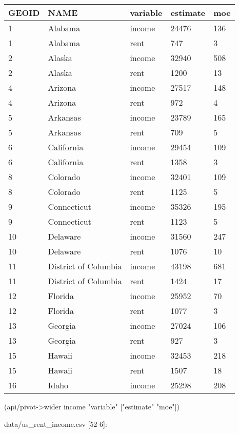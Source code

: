 \documentclass[]{article}
\newenvironment{Shaded}{\begin{snugshade}}{\end{snugshade}}
\newcommand{\StringTok}[1]{\textcolor[rgb]{0.31,0.60,0.02}{#1}}
\newcommand{\NormalTok}[1]{#1}
\begin{document}
\begin{longtable}[]{@{}lllll@{}}
\toprule
GEOID & NAME & variable & estimate & moe\tabularnewline
\midrule
\endhead
1 & Alabama & income & 24476 & 136\tabularnewline
1 & Alabama & rent & 747 & 3\tabularnewline
2 & Alaska & income & 32940 & 508\tabularnewline
2 & Alaska & rent & 1200 & 13\tabularnewline
4 & Arizona & income & 27517 & 148\tabularnewline
4 & Arizona & rent & 972 & 4\tabularnewline
5 & Arkansas & income & 23789 & 165\tabularnewline
5 & Arkansas & rent & 709 & 5\tabularnewline
6 & California & income & 29454 & 109\tabularnewline
6 & California & rent & 1358 & 3\tabularnewline
8 & Colorado & income & 32401 & 109\tabularnewline
8 & Colorado & rent & 1125 & 5\tabularnewline
9 & Connecticut & income & 35326 & 195\tabularnewline
9 & Connecticut & rent & 1123 & 5\tabularnewline
10 & Delaware & income & 31560 & 247\tabularnewline
10 & Delaware & rent & 1076 & 10\tabularnewline
11 & District of Columbia & income & 43198 & 681\tabularnewline
11 & District of Columbia & rent & 1424 & 17\tabularnewline
12 & Florida & income & 25952 & 70\tabularnewline
12 & Florida & rent & 1077 & 3\tabularnewline
13 & Georgia & income & 27024 & 106\tabularnewline
13 & Georgia & rent & 927 & 3\tabularnewline
15 & Hawaii & income & 32453 & 218\tabularnewline
15 & Hawaii & rent & 1507 & 18\tabularnewline
16 & Idaho & income & 25298 & 208\tabularnewline
\bottomrule
\end{longtable}

\begin{Shaded}
\begin{Highlighting}[]
\NormalTok{(api/pivot->wider income }\StringTok{"variable"}\NormalTok{ [}\StringTok{"estimate"} \StringTok{"moe"}\NormalTok{])}
\end{Highlighting}
\end{Shaded}

data/us\_rent\_income.csv {[}52 6{]}:
\end{document}
